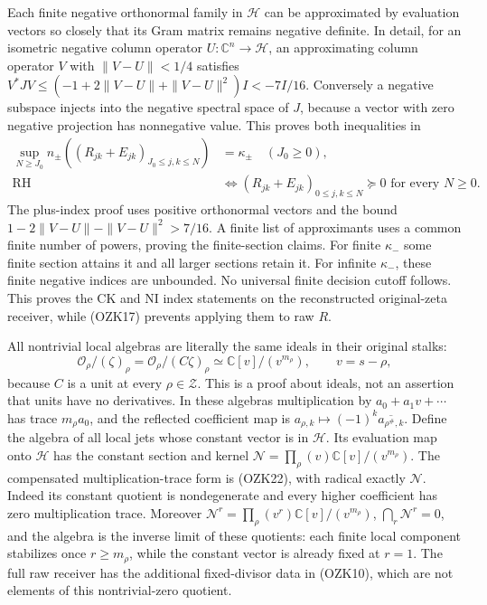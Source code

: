 \documentclass[
  10pt,
  a4paper,
]{article}
\begin{document}
Each finite negative orthonormal family in \(\mathcal H\) can be
approximated by evaluation vectors so closely that its Gram matrix
remains negative definite. In detail, for an isometric negative column
operator \(U:\mathbb C^n\to\mathcal H\), an approximating column
operator \(V\) with \(\|V-U\|<1/4\) satisfies
\(V^*JV\le(-1+2\|V-U\|+\|V-U\|^2)I<-7I/16\). Conversely a negative
subspace injects into the negative spectral space of \(J\), because a
vector with zero negative projection has nonnegative value. This proves
both inequalities in \[
\begin{aligned}
\sup_{N\ge J_0}n_\pm((R_{jk}+E_{jk})_{J_0\le j,k\le N})&=\kappa_\pm
\quad(J_0\ge0),\\
\mathrm{RH}&\Longleftrightarrow
(R_{jk}+E_{jk})_{0\le j,k\le N}\succeq0
\text{ for every }N\ge0.
\end{aligned}\tag{OZK23}
\] The plus-index proof uses positive orthonormal vectors and the bound
\(1-2\|V-U\|-\|V-U\|^2>7/16\). A finite list of approximants uses a
common finite number of powers, proving the finite-section claims. For
finite \(\kappa_-\) some finite section attains it and all larger
sections retain it. For infinite \(\kappa_-\), these finite negative
indices are unbounded. No universal finite decision cutoff follows. This
proves the CK and NI index statements on the reconstructed original-zeta
receiver, while (OZK17) prevents applying them to raw \(R\).

All nontrivial local algebras are literally the same ideals in their
original stalks: \[
\mathcal O_\rho/(\zeta)_\rho
=\mathcal O_\rho/(C\zeta)_\rho
\simeq\mathbb C[v]/(v^{m_\rho}),\qquad v=s-\rho,
\tag{OZK24}
\] because \(C\) is a unit at every \(\rho\in\mathcal Z\). This is a
proof about ideals, not an assertion that units have no derivatives. In
these algebras multiplication by \(a_0+a_1v+\cdots\) has trace
\(m_\rho a_0\), and the reflected coefficient map is
\(a_{\rho,k}\mapsto(-1)^k\overline{a_{\rho^\#,k}}\). Define the algebra
of all local jets whose constant vector is in \(\mathcal H\). Its
evaluation map onto \(\mathcal H\) has the constant section and kernel
\(\mathcal N=\prod_\rho(v)\mathbb C[v]/(v^{m_\rho})\). The compensated
multiplication-trace form is (OZK22), with radical exactly
\(\mathcal N\). Indeed its constant quotient is nondegenerate and every
higher coefficient has zero multiplication trace. Moreover
\(\mathcal N^r=\prod_\rho(v^r)\mathbb C[v]/(v^{m_\rho})\),
\(\bigcap_r\mathcal N^r=0\), and the algebra is the inverse limit of
these quotients: each finite local component stabilizes once
\(r\ge m_\rho\), while the constant vector is already fixed at \(r=1\).
The full raw receiver has the additional fixed-divisor data in (OZK10),
which are not elements of this nontrivial-zero quotient.
\end{document}
